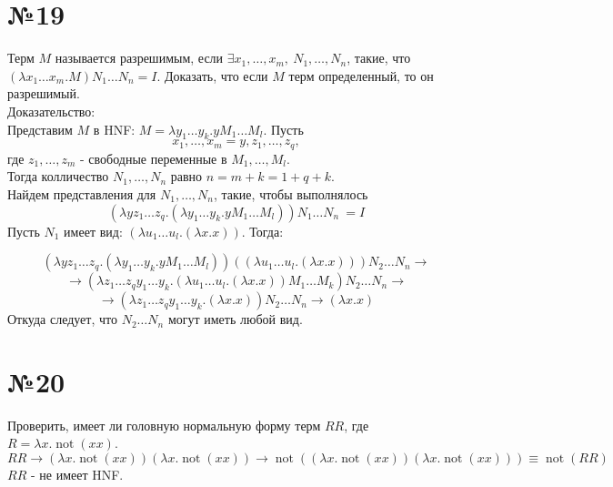 \documentclass[a4paper,14pt]{scrreprt}
\newcommand{\lmd}{\lambda}
\DeclareMathOperator{\mnot}{not}
\begin{document}
\section*{№19}
Терм $M$ называется разрешимым, если $\exists x_1, \dots, x_m, \ N_1, \dots, N_n$, такие, 
что $(\lmd x_1\dots x_m.M)N_1\dots N_n=I$. Доказать, что если $M$ терм определенный, то он разрешимый. \\

Доказательство: \\

Представим $M$ в HNF: $M = \lmd y_1\dots y_k. y  M_1\dots M_l$.
Пусть 
$$ x_1, \dots, x_m = y, z_1, \dots, z_q, $$
где $z_1, \dots, z_m$ - свободные переменные в $M_1, \dots, M_l$. \\
Тогда колличество $N_1, \dots, N_n$ равно $n = m + k = 1 + q + k$. \\
Найдем представления для $N_1, \dots, N_n$, такие, чтобы выполнялось 
$$(\lmd yz_1\dots z_q.(\lmd y_1 \dots y_k.yM_1\dots M_l))N_1\dots N_n\ = I$$
Пусть $N_1$ имеет вид: $(\lmd u_1\dots u_l.(\lmd x.x))$. Тогда:

$$ (\lmd yz_1\dots z_q.(\lmd y_1 \dots y_k.yM_1\dots M_l))((\lmd u_1\dots u_l.(\lmd x.x)))N_2\dots N_n \to $$ 
$$ \to (\lmd z_1\dots z_q y_1 \dots y_k.(\lmd u_1\dots u_l.(\lmd x.x))M_1\dots M_k)N_2\dots N_n\to $$
$$	\to(\lmd z_1\dots z_q y_1 \dots y_k.(\lmd x.x))N_2\dots N_n \to(\lmd x.x) $$
Откуда следует, что $N_2\dots N_n$ могут иметь любой вид.

\section*{№20}
Проверить, имеет ли головную нормальную форму терм $RR$, где $R=\lambda x.\mnot (x x)$.
$$ RR \to (\lmd x.\mnot (xx))(\lmd x.\mnot (xx)) \to \mnot((\lmd x.\mnot (xx))(\lmd x.\mnot (xx))) \equiv \mnot(RR) $$
$RR$ - не имеет HNF. 
\end{document}
